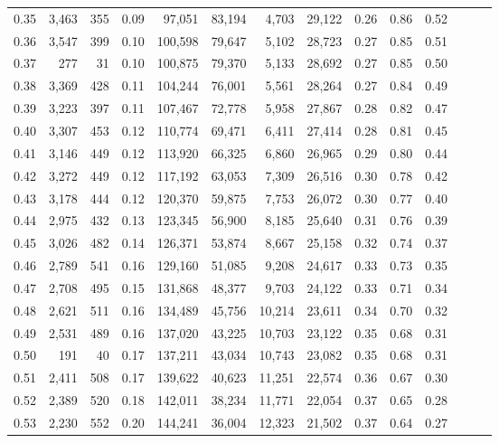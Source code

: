 \begin{tabular}{rrrrrrrrrrrrrr}
0.35 &  3,463 &  355 &  0.09 &   97,051 &   83,194 &   4,703 &  29,122 &  0.26 &  0.86 &      0.52 \\
0.36 &  3,547 &  399 &  0.10 &  100,598 &   79,647 &   5,102 &  28,723 &  0.27 &  0.85 &      0.51 \\
0.37 &    277 &   31 &  0.10 &  100,875 &   79,370 &   5,133 &  28,692 &  0.27 &  0.85 &      0.50 \\
0.38 &  3,369 &  428 &  0.11 &  104,244 &   76,001 &   5,561 &  28,264 &  0.27 &  0.84 &      0.49 \\
0.39 &  3,223 &  397 &  0.11 &  107,467 &   72,778 &   5,958 &  27,867 &  0.28 &  0.82 &      0.47 \\
0.40 &  3,307 &  453 &  0.12 &  110,774 &   69,471 &   6,411 &  27,414 &  0.28 &  0.81 &      0.45 \\
0.41 &  3,146 &  449 &  0.12 &  113,920 &   66,325 &   6,860 &  26,965 &  0.29 &  0.80 &      0.44 \\
0.42 &  3,272 &  449 &  0.12 &  117,192 &   63,053 &   7,309 &  26,516 &  0.30 &  0.78 &      0.42 \\
0.43 &  3,178 &  444 &  0.12 &  120,370 &   59,875 &   7,753 &  26,072 &  0.30 &  0.77 &      0.40 \\
0.44 &  2,975 &  432 &  0.13 &  123,345 &   56,900 &   8,185 &  25,640 &  0.31 &  0.76 &      0.39 \\
0.45 &  3,026 &  482 &  0.14 &  126,371 &   53,874 &   8,667 &  25,158 &  0.32 &  0.74 &      0.37 \\
0.46 &  2,789 &  541 &  0.16 &  129,160 &   51,085 &   9,208 &  24,617 &  0.33 &  0.73 &      0.35 \\
0.47 &  2,708 &  495 &  0.15 &  131,868 &   48,377 &   9,703 &  24,122 &  0.33 &  0.71 &      0.34 \\
0.48 &  2,621 &  511 &  0.16 &  134,489 &   45,756 &  10,214 &  23,611 &  0.34 &  0.70 &      0.32 \\
0.49 &  2,531 &  489 &  0.16 &  137,020 &   43,225 &  10,703 &  23,122 &  0.35 &  0.68 &      0.31 \\
0.50 &    191 &   40 &  0.17 &  137,211 &   43,034 &  10,743 &  23,082 &  0.35 &  0.68 &      0.31 \\
0.51 &  2,411 &  508 &  0.17 &  139,622 &   40,623 &  11,251 &  22,574 &  0.36 &  0.67 &      0.30 \\
0.52 &  2,389 &  520 &  0.18 &  142,011 &   38,234 &  11,771 &  22,054 &  0.37 &  0.65 &      0.28 \\
0.53 &  2,230 &  552 &  0.20 &  144,241 &   36,004 &  12,323 &  21,502 &  0.37 &  0.64 &      0.27 \\

\end{tabular}
